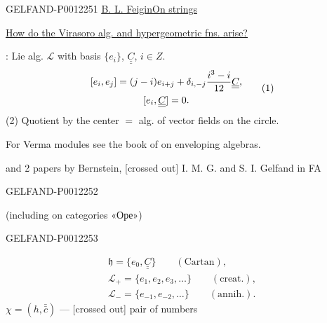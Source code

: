 \begin{GelfandAdjacentEvidence}{GELFAND-P001225}{1}
\underline{\underline{B. L. Feigin}}\qquad\underline{On strings}

\underline{How do the Virasoro alg. and hypergeometric fns. arise?}

: Lie alg. \(\mathcal L\) with basis
\(\{e_i\}\), \(\underline{\underline{C}}\), \(i\in Z\).
\begin{equation*}
\begin{gathered}
\relax [e_i,e_j]=(j-i)e_{i+j}+\delta_{i,-j}\frac{i^3-i}{12}\underline{\underline{C}},\\[0pt]
[e_i,\underline{\underline{C}}]=0.
\end{gathered}\tag{1}
\end{equation*}
(2) Quotient by the center \(=\) alg. of vector fields on the circle.

For Verma modules see the book of  on enveloping algebras.

and 2 papers by Bernstein, [crossed out] I. M. G. and S. I. Gelfand in FA
\end{GelfandAdjacentEvidence}
\begin{GelfandAdjacentEvidence}{GELFAND-P001225}{2}


(including on categories «Оре»)
\end{GelfandAdjacentEvidence}
\begin{GelfandAdjacentEvidence}{GELFAND-P001225}{3}

\begin{equation*}
\begin{gathered}
\mathfrak h=\{e_0,\underline{\underline{C}}\}\qquad(\text{Cartan}),\\
\mathcal L_+=\{e_1,e_2,e_3,\ldots\}\qquad(\text{creat.}),\\
\mathcal L_-=\{e_{-1},e_{-2},\ldots\}\qquad(\text{annih.}).
\end{gathered}
\end{equation*}
\(\chi=(h,\bar{\bar{c}})\) --- [crossed out] pair of numbers
\end{GelfandAdjacentEvidence}


